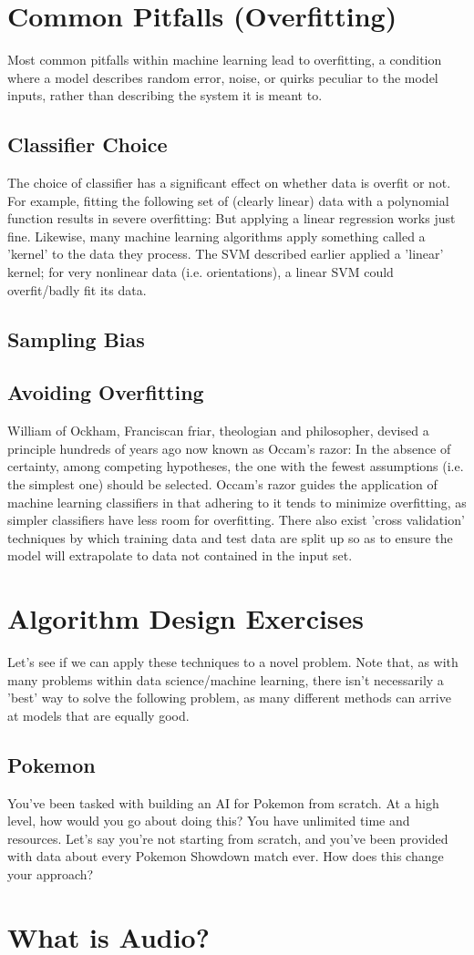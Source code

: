 \documentclass[11pt]{article}
\begin{document}
\section{Common Pitfalls (Overfitting)}
Most common pitfalls within machine learning lead to overfitting, a condition where a model describes random error, noise, or quirks peculiar to the model inputs, rather than describing the system it is meant to.
\subsection{Classifier Choice}
The choice of classifier has a significant effect on whether data is overfit or not. For example, fitting the following set of (clearly linear) data with a polynomial function results in severe overfitting: 
But applying a linear regression works just fine. Likewise, many machine learning algorithms apply something called a 'kernel' to the data they process. The SVM described earlier applied a 'linear' kernel; for very nonlinear data (i.e. orientations), a linear SVM could overfit/badly fit its data.
\subsection{Sampling Bias}
\subsection{Avoiding Overfitting}
William of Ockham, Franciscan friar, theologian and philosopher, devised a principle hundreds of years ago now known as Occam's razor: In the absence of certainty, among competing hypotheses, the one with the fewest assumptions (i.e. the simplest one) should be selected. Occam's razor guides the application of machine learning classifiers in that adhering to it tends to minimize overfitting, as simpler classifiers have less room for overfitting. There also exist 'cross validation' techniques by which training data and test data are split up so as to ensure the model will extrapolate to data not contained in the input set.

\section{Algorithm Design Exercises}
Let's see if we can apply these techniques to a novel problem. Note that, as with many problems within data science/machine learning, there isn't necessarily a 'best' way to solve the following problem, as many different methods can arrive at models that are equally good.
\subsection{Pokemon}
You've been tasked with building an AI for Pokemon from scratch. At a high level, how would you go about doing this? You have unlimited time and resources. 
Let's say you're not starting from scratch, and you've been provided with data about every Pokemon Showdown match ever. How does this change your approach?

\section{What is Audio?}
\end{document}
